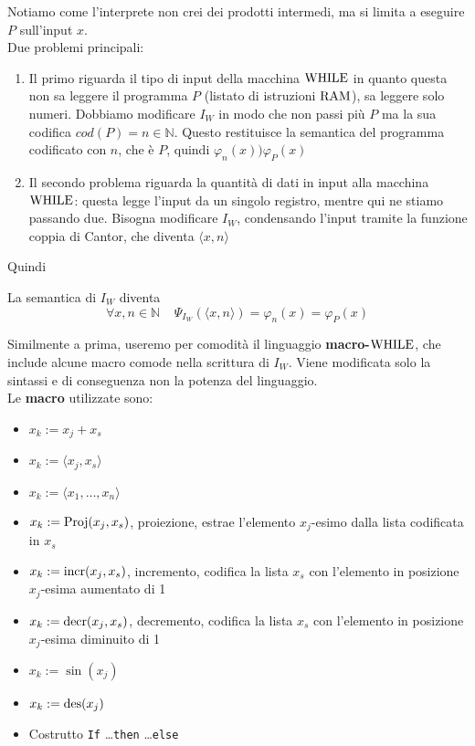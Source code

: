 Notiamo come l'interprete non crei dei prodotti intermedi, ma si limita a eseguire $P$ sull'input $x$.\\

Due problemi principali: 
\begin{enumerate}
	\item Il primo riguarda il tipo di input della macchina $\text{WHILE}$ in quanto questa non sa leggere il programma $P$ (listato di istruzioni $\text{RAM}$), sa leggere solo numeri. Dobbiamo modificare $I_W$ in modo che non passi più $P$ ma la sua codifica $cod(P) = n \in \mathbb{N}$. Questo restituisce la semantica del programma codificato con $n$, che è $P$, quindi $\varphi_n (x) ) \varphi_P (x)$
	\item Il secondo problema riguarda la quantità di dati in input alla macchina $\text{WHILE}$: questa legge l'input da un singolo registro, mentre qui ne stiamo passando due. Bisogna modificare $I_W$, condensando l'input tramite la funzione coppia di Cantor, che diventa $\langle x,n \rangle$
\end{enumerate}
Quindi
\begin{center}
	
\end{center}

La semantica di $I_W$ diventa
$$ \forall x,n \in \mathbb{N} \;\;\;\; \Psi_{I_W} \left(\langle x,n \rangle \right) = \varphi_n (x) = \varphi_P (x) $$

Similmente a prima, useremo per comodità il linguaggio \textbf{macro-$\text{WHILE}$}, che include alcune macro comode nella scrittura di $I_W$. Viene modificata solo la sintassi e di conseguenza non la potenza del linguaggio.\\

Le \textbf{macro} utilizzate sono: 
\begin{itemize}
	\item $x_k := x_j + x_s$
	\item $x_k := \langle x_j, x_s \rangle$
	\item $x_k := \langle x_1, \dots, x_n \rangle$
	\item $x_k := \text{Proj}(x_j, x_s)$, proiezione, estrae l'elemento $x_j$-esimo dalla lista codificata in $x_s$
	\item $x_k := \text{incr} (x_j, x_s)$, incremento, codifica la lista $x_s$ con l'elemento in posizione $x_j$-esima aumentato di 1
	\item $x_k := \text{decr}(x_j, x_s)$, decremento, codifica la lista $x_s$ con l'elemento in posizione $x_j$-esima diminuito di 1
	\item $x_k := \sin (x_j)$
	\item $x_k := \operatorname{des} (x_j)$
	\item Costrutto \texttt{If} \dots \texttt{then} \dots \texttt{else}
\end{itemize}

